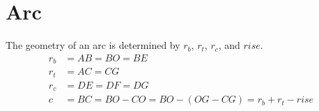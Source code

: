 \section{Arc}

The geometry of an arc is determined by $r_b$, $r_t$, $r_c$, and $rise$. 
\begin{equation}
\begin{aligned}
r_b & = AB = BO = BE \\
r_t & = AC = CG \\
r_c & = DE = DF = DG \\
c & = BC =BO - CO = BO - (OG - CG) =  r_b + r_t - rise \\
\end{aligned}
\end{equation}

